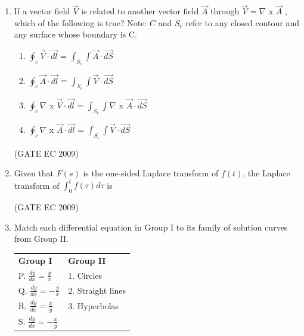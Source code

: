 \documentclass[journal,12pt,onecolumn]{IEEEtran}
\theoremstyle{remark}
\begin{document}
\begin{enumerate}[start=1, label={Q\arabic*.}]
\item If a vector field $\Vec{V}$ is related to another vector field $\Vec{A}$ through $\Vec{V}=\nabla$ x $\Vec{A}$ , which of the following is true? Note: $C$ and $S_c$ refer to any closed contour and any surface whose boundary is C.
\begin{enumerate}[label=(\Alph*)]
    \item $\oint_c \Vec{V}\cdot \Vec{dl}$ = $\int_{S_c} \int \Vec{A}\cdot \Vec{dS}$
    \item $\oint_c \Vec{A}\cdot \Vec{dl}$ = $\int_{S_c} \int \Vec{V}\cdot \Vec{dS}$
    \item $\oint_c  \nabla$ x $\Vec{V}\cdot \Vec{dl}$ = $\int_{S_c} \int \nabla$ x $\Vec{A}\cdot \Vec{dS}$
    \item $\oint_c \nabla$ x $\Vec{A}\cdot \Vec{dl}$ = $\int_{S_c} \int \Vec{V}\cdot \Vec{dS}$
\end{enumerate}
\hfill (GATE EC 2009)

\item Given that $F(s)$ is the one-sided Laplace transform of $f(t)$, the Laplace transform of $\int_0^t f(\tau) d\tau$ is 

\begin{enumerate}[label=(\Alph*)]
\end{enumerate}
\hfill (GATE EC 2009)

\item Match each differential equation in Group I to its family of solution curves from Group II.
\begin{center}
    \begin{tabular}{ll}
\textbf{Group I} & \textbf{Group II} \\
P. $\frac{dy}{dx}=\frac{y}{x}$ & 1. Circles \\
Q. $\frac{dy}{dx}=-\frac{y}{x}$ & 2. Straight lines \\
R. $\frac{dy}{dx}=\frac{x}{y}$ & 3. Hyperbolas \\
S. $\frac{dy}{dx}=-\frac{x}{y}$ & \\
\end{tabular}
\end{center}


\end{enumerate}
\end{document}
